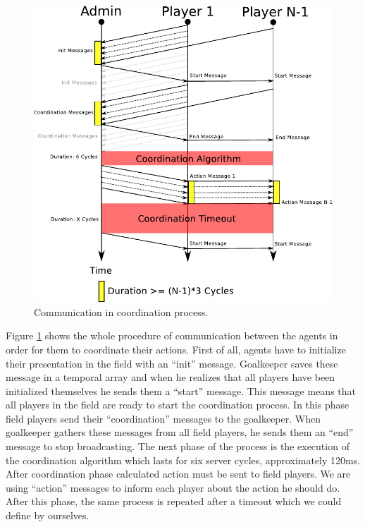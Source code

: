 \begin{figure}[htb!]
\centering
  \includegraphics[scale=1]{Chapter4/figures/CoordComm.pdf}
  \caption{Communication in coordination process.} 
  \label{fig:coordinationprocess}
\end{figure}
Figure \ref{fig:coordinationprocess} shows the whole procedure of communication between the agents in order for them to coordinate their actions. First of all, agents have to initialize their presentation in the field with an ``init'' message. Goalkeeper saves these message in a temporal array and when he realizes that all players have been initialized themselves he sends them a ``start'' message. This message means that all players in the field are ready to start the coordination process. In this phase field players send their ``coordination'' messages to the goalkeeper. When goalkeeper gathers these messages from all field players, he sends them an ``end'' message to stop broadcasting. The next phase of the process is the execution of the coordination algorithm which lasts for six server cycles, approximately 120ms. After coordination phase calculated action must be sent to field players. We are using ``action'' messages to inform each player about the action he should do. After this phase, the same process is repeated after a timeout which we could define by ourselves.


